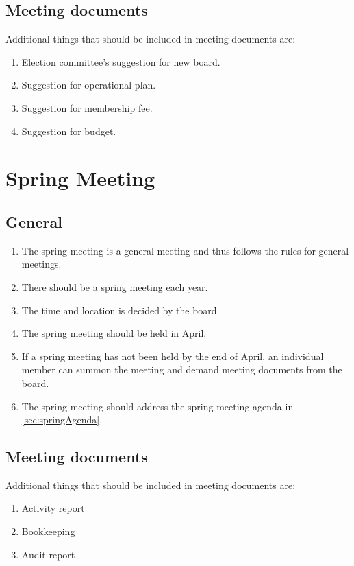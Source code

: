 \subsection{Meeting documents} \label{sec:additionalfall}
Additional things that should be included in meeting documents are:
\begin{enumerate}
  \item Election committee’s suggestion for new board.
  \item Suggestion for operational plan.
  \item Suggestion for membership fee.
  \item Suggestion for budget. 
\end{enumerate}

\section*{Spring Meeting}
\subsection{General}
\begin{enumerate}
  \item The spring meeting is a general meeting and thus follows the rules for general meetings.
  \item There should be a spring meeting each year.
  \item The time and location is decided by the board.
  \item The spring meeting should be held in April.
  \item If a spring meeting has not been held by the end of April, an individual member can summon the meeting and demand meeting documents from the board.
  \item The spring meeting should address the spring meeting agenda in \ref{sec:springAgenda}.
\end{enumerate}

\subsection{Meeting documents} \label{sec:additionalspring}
Additional things that should be included in meeting documents are:
\begin{enumerate}
  \item Activity report
  \item Bookkeeping
  \item Audit report
\end{enumerate}

